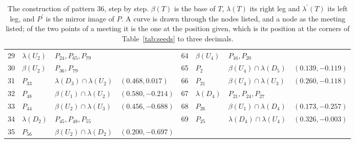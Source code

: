 \begin{table}[p]
\begin{tabular}{@{}rlll@{\qquad}rlll@{}}
29 & $\lambda(U_{2})$ & $P_{24}, P_{65}, P_{79}$ &  & 64 & $\beta(U_{4})$ & $P_{16}, P_{20}$ &  \\
30 & $\beta(U_{2})$ & $P_{36}, P_{79}$ &  & 65 & $P_{2}$ & $\beta(U_{4}) \cap \lambda(D_{5})$ & $(0.139, -0.119)$ \\
31 & $P_{33}$ & $\lambda(D_{3}) \cap \lambda(U_{2})$ & $(0.468, 0.017)$ & 66 & $P_{21}$ & $\beta(U_{4}) \cap \lambda(U_{3})$ & $(0.260, -0.118)$ \\
32 & $P_{48}$ & $\beta(U_{1}) \cap \lambda(U_{2})$ & $(0.580, -0.214)$ & 67 & $\lambda(D_{4})$ & $P_{21}, P_{24}, P_{27}$ &  \\
33 & $P_{44}$ & $\beta(U_{2}) \cap \lambda(U_{3})$ & $(0.456, -0.688)$ & 68 & $P_{26}$ & $\beta(U_{1}) \cap \lambda(D_{4})$ & $(0.173, -0.257)$ \\
34 & $\lambda(D_{2})$ & $P_{45}, P_{48}, P_{55}$ &  & 69 & $P_{25}$ & $\lambda(D_{4}) \cap \lambda(U_{4})$ & $(0.326, -0.003)$ \\
35 & $P_{56}$ & $\beta(U_{2}) \cap \lambda(D_{2})$ & $(0.200, -0.697)$ &  &  &  &  \\
\bottomrule
\end{tabular}
\caption{The construction of pattern $36$, step by step. $\beta(T)$ is the base of $T$, $\lambda(T)$ its right leg and $\lambda^\prime(T)$ its left leg, and $P^\prime$ is the mirror image of $P$. A curve is drawn through the nodes listed, and a node as the meeting listed; of the two points of a meeting it is the one at the position given, which is its position at the corners of Table~\ref{tab:seeds} to three decimals.}
\label{tab:steps36}
\end{table}
